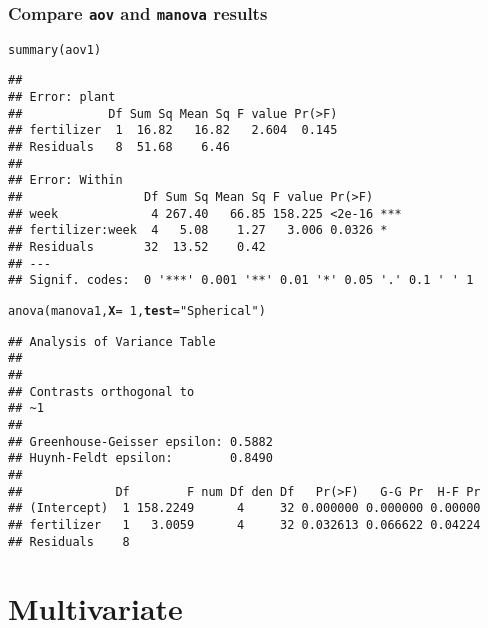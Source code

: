 \documentclass[color=usenames,dvipsnames]{beamer}\usepackage[]{graphicx}\usepackage[]{color}
\makeatletter
\newcommand{\hlnum}[1]{\textcolor[rgb]{0.69,0.494,0}{#1}}%
\newcommand{\hlstr}[1]{\textcolor[rgb]{0.749,0.012,0.012}{#1}}%
\newcommand{\hlopt}[1]{\textcolor[rgb]{0,0,0}{#1}}%
\newcommand{\hlstd}[1]{\textcolor[rgb]{0,0,0}{#1}}%
\newcommand{\hlkwc}[1]{\textcolor[rgb]{0,0,0}{\textbf{#1}}}%
\newcommand{\hlkwd}[1]{\textcolor[rgb]{0.004,0.004,0.506}{#1}}%
\newenvironment{kframe}{%
 \def\at@end@of@kframe{}%
 \ifinner\ifhmode%
  \def\at@end@of@kframe{\end{minipage}}%
  \begin{minipage}{\columnwidth}%
 \fi\fi%
 \def\FrameCommand##1{\hskip\@totalleftmargin \hskip-\fboxsep
 \colorbox{shadecolor}{##1}\hskip-\fboxsep
     \hskip-\linewidth \hskip-\@totalleftmargin \hskip\columnwidth}%
 \MakeFramed {\advance\hsize-\width
   \@totalleftmargin\z@ \linewidth\hsize
   \@setminipage}}%
 {\par\unskip\endMakeFramed%
 \at@end@of@kframe}
\newenvironment{knitrout}{}{} %
\makeatother
\begin{document}
\begin{frame}[fragile]
  \frametitle{Compare {\tt aov} and {\tt manova} results}
  \tiny
\begin{knitrout}\tiny
{}\color{fgcolor}\begin{kframe}
\begin{alltt}
\hlkwd{summary}\hlstd{(aov1)}
\end{alltt}
\begin{verbatim}
## 
## Error: plant
##            Df Sum Sq Mean Sq F value Pr(>F)
## fertilizer  1  16.82   16.82   2.604  0.145
## Residuals   8  51.68    6.46               
## 
## Error: Within
##                 Df Sum Sq Mean Sq F value Pr(>F)    
## week             4 267.40   66.85 158.225 <2e-16 ***
## fertilizer:week  4   5.08    1.27   3.006 0.0326 *  
## Residuals       32  13.52    0.42                   
## ---
## Signif. codes:  0 '***' 0.001 '**' 0.01 '*' 0.05 '.' 0.1 ' ' 1
\end{verbatim}
\begin{alltt}
\hlkwd{anova}\hlstd{(manova1,} \hlkwc{X}\hlstd{=}\hlopt{~}\hlnum{1}\hlstd{,} \hlkwc{test}\hlstd{=}\hlstr{"Spherical"}\hlstd{)}
\end{alltt}
\begin{verbatim}
## Analysis of Variance Table
## 
## 
## Contrasts orthogonal to
## ~1
## 
## Greenhouse-Geisser epsilon: 0.5882
## Huynh-Feldt epsilon:        0.8490
## 
##             Df        F num Df den Df   Pr(>F)   G-G Pr  H-F Pr
## (Intercept)  1 158.2249      4     32 0.000000 0.000000 0.00000
## fertilizer   1   3.0059      4     32 0.032613 0.066622 0.04224
## Residuals    8
\end{verbatim}
\end{kframe}
\end{knitrout}
\end{frame}











\section{Multivariate}
\end{document}

